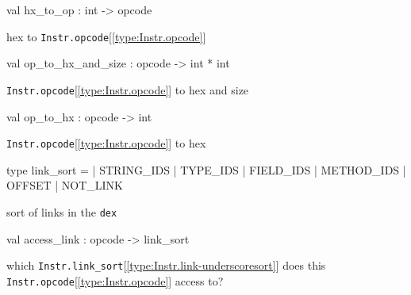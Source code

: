\documentclass[11pt]{article}
\begin{document}
\label{val:Instr.hx-underscoreto-underscoreop}\begin{ocamldoccode}
val hx_to_op : int -> opcode
\end{ocamldoccode}
\begin{ocamldocdescription}
hex to {\tt{Instr.opcode}}[\ref{type:Instr.opcode}]


\end{ocamldocdescription}




\label{val:Instr.op-underscoreto-underscorehx-underscoreand-underscoresize}\begin{ocamldoccode}
val op_to_hx_and_size : opcode -> int * int
\end{ocamldoccode}
\begin{ocamldocdescription}
{\tt{Instr.opcode}}[\ref{type:Instr.opcode}] to hex and size


\end{ocamldocdescription}




\label{val:Instr.op-underscoreto-underscorehx}\begin{ocamldoccode}
val op_to_hx : opcode -> int
\end{ocamldoccode}
\begin{ocamldocdescription}
{\tt{Instr.opcode}}[\ref{type:Instr.opcode}] to hex


\end{ocamldocdescription}




\label{type:Instr.link-underscoresort}\begin{ocamldoccode}
type link_sort =
  | STRING_IDS
  | TYPE_IDS
  | FIELD_IDS
  | METHOD_IDS
  | OFFSET
  | NOT_LINK
\end{ocamldoccode}
\begin{ocamldocdescription}
sort of links in the {\tt{dex}}


\end{ocamldocdescription}




\label{val:Instr.access-underscorelink}\begin{ocamldoccode}
val access_link : opcode -> link_sort
\end{ocamldoccode}
\begin{ocamldocdescription}
which {\tt{Instr.link\_sort}}[\ref{type:Instr.link-underscoresort}] does this {\tt{Instr.opcode}}[\ref{type:Instr.opcode}] access to?


\end{ocamldocdescription}
\end{document}
